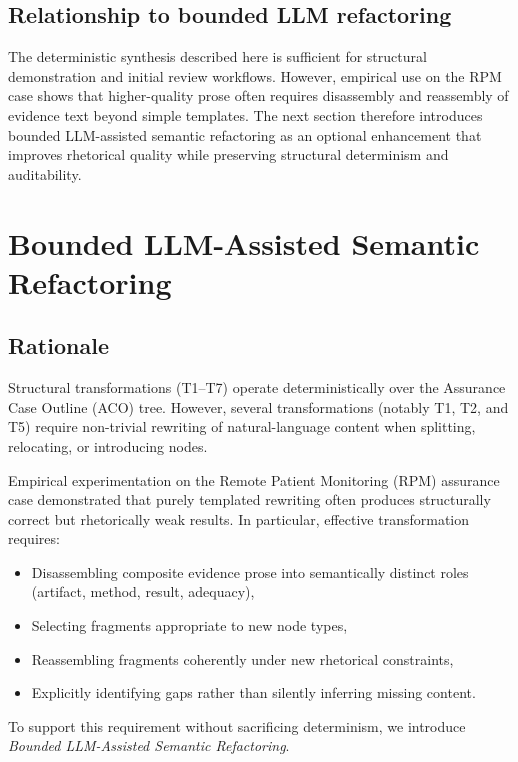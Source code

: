 \documentclass[12pt,twoside,a4paper]{article}
\begin{document}
\subsection{Relationship to bounded LLM refactoring}

The deterministic synthesis described here is sufficient for structural demonstration and initial review workflows. However, empirical use on the RPM case shows that higher-quality prose often requires disassembly and reassembly of evidence text beyond simple templates. The next section therefore introduces bounded LLM-assisted semantic refactoring as an optional enhancement that improves rhetorical quality while preserving structural determinism and auditability.


\section{Bounded LLM-Assisted Semantic Refactoring}

\subsection{Rationale}

Structural transformations (T1--T7) operate deterministically over the Assurance Case Outline (ACO) tree. However, several transformations (notably T1, T2, and T5) require non-trivial rewriting of natural-language content when splitting, relocating, or introducing nodes. 

Empirical experimentation on the Remote Patient Monitoring (RPM) assurance case demonstrated that purely templated rewriting often produces structurally correct but rhetorically weak results. In particular, effective transformation requires:

\begin{itemize}
  \item Disassembling composite evidence prose into semantically distinct roles (artifact, method, result, adequacy),
  \item Selecting fragments appropriate to new node types,
  \item Reassembling fragments coherently under new rhetorical constraints,
  \item Explicitly identifying gaps rather than silently inferring missing content.
\end{itemize}

To support this requirement without sacrificing determinism, we introduce \emph{Bounded LLM-Assisted Semantic Refactoring}.
\end{document}
